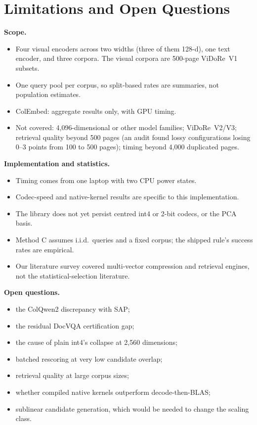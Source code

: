 \documentclass[conference]{IEEEtran}
\begin{document}
\section{Limitations and Open Questions}
\label{sec:limits}

\textbf{Scope.}
\begin{itemize}
\item Four visual encoders across two widths (three of them 128-d), one text encoder,
and three corpora. The visual corpora are 500-page ViDoRe~V1 subsets.
\item One query pool per corpus, so split-based rates are summaries, not population
estimates.
\item ColEmbed: aggregate results only, with GPU timing.
\item Not covered: 4,096-dimensional or other model families; ViDoRe~V2/V3; retrieval
quality beyond 500 pages (an audit found lossy configurations losing 0--3 points from
100 to 500 pages); timing beyond 4,000 duplicated pages.
\end{itemize}

\textbf{Implementation and statistics.}
\begin{itemize}
\item Timing comes from one laptop with two CPU power states.
\item Codec-speed and native-kernel results are specific to this implementation.
\item The library does not yet persist centred int4 or 2-bit codecs, or the PCA basis.
\item Method C assumes i.i.d.\ queries and a fixed corpus; the shipped rule's success
rates are empirical.
\item Our literature survey covered multi-vector compression and retrieval engines, not
the statistical-selection literature.
\end{itemize}

\textbf{Open questions.}
\begin{itemize}
\item the ColQwen2 discrepancy with SAP;
\item the residual DocVQA certification gap;
\item the cause of plain int4's collapse at 2,560 dimensions;
\item batched rescoring at very low candidate overlap;
\item retrieval quality at large corpus sizes;
\item whether compiled native kernels outperform decode-then-BLAS;
\item sublinear candidate generation, which would be needed to change the scaling class.
\end{itemize}
\end{document}
